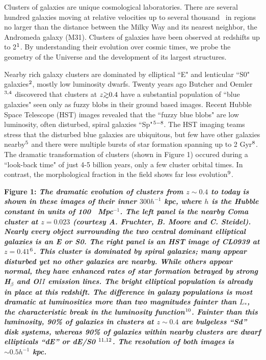 Clusters of galaxies are unique cosmological laboratories.  There are
several hundred galaxies moving at relative velocities up to several
thousand \kms\ in regions no larger than the distance between the Milky
Way and its nearest neighbor, the Andromeda galaxy (M31).  Clusters of
galaxies have been observed at redshifts up to 2$^{\bf\rm 1}$.  By
understanding their evolution over cosmic times, we probe the geometry
of the Universe and the development of its largest structures.

Nearby rich galaxy clusters are dominated by elliptical ``E" and
lenticular ``S0" galaxies$^{\bf\rm 2}$, mostly low luminosity dwarfs.
Twenty years ago Butcher and Oemler$^{\bf\rm 3,4}$ discovered that
clusters at $z \gsim 0.4$ have a substantial population of ``blue
galaxies" seen only as fuzzy blobs in their ground based images.
Recent Hubble Space Telescope (HST) images revealed that the ``fuzzy
blue blobs" are low luminosity, often disturbed, spiral galaxies
``Sp"$^{\bf\rm 5-8}$.  The HST imaging teams stress that the disturbed
blue galaxies are ubiquitous, but few have
other galaxies nearby$^{\bf\rm 5}$ and
there were multiple bursts of star formation
spanning up to 2 Gyr$^{\bf\rm 8}$.
The dramatic transformation of clusters (shown in Figure 1)
occured during a ``look-back time" of just 4-5 billion years,
only a few cluster
orbital times.  In contrast, the morphological fraction in the field
shows far less evolution$^{\bf\rm 9}$.

\oneskip
{\bf Figure 1: \em The dramatic evolution of clusters from $z \sim
0.4$ to today is shown in these images of their inner $300h^{-1}$ kpc,
where $h$ is the Hubble constant in units of 100 \kms\ Mpc$^{-1}$.
The left panel is the nearby Coma cluster at $z=0.023$ (courtesy
A. Fruchter, B. Moore and C. Steidel).  Nearly every object
surrounding the two central dominant elliptical galaxies is an E or
S0.  The right panel is an HST image of CL0939 at $z=0.41$$^{\bf\rm
6}$.  This cluster is dominated by spiral galaxies; many appear
disturbed yet no other galaxies are nearby.  While others appear
normal, they have enhanced rates of star formation betrayed by strong
{\em H}$_\beta$ and {\em O}$II$ emission lines.  The bright elliptical
population is already in place at this redshift. The difference in
galaxy populations is most dramatic at luminosities more than two
magnitudes fainter than $L_*$, the characteristic break in the
luminosity function$^{\bf\rm 10}$. Fainter than this luminosity, 90\%
of galaxies in clusters at $z \sim 0.4$ are bulgeless ``Sd'' disk
systems, whereas 90\% of galaxies within nearby clusters are dwarf
ellipticals ``dE'' or dE/S0 $^{\bf\rm 11,12}$. The resolution of both
images is $\sim 0.5h^{-1}$ kpc. }
\oneskip

